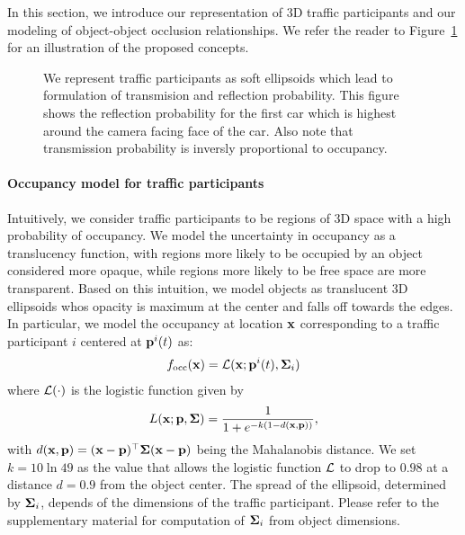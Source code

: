 
In this section, we introduce our representation of 3D traffic participants and our modeling of object-object occlusion relationships. We refer the reader to Figure~\ref{fig:reflectiontransimission} for an illustration of the proposed concepts.

\begin{figure}
  \usetikzlibrary{calc}
  \centering
  \begin{tikzpicture}
    
  \end{tikzpicture}
  \caption{We represent traffic participants as soft ellipsoids which lead to formulation of transmision and reflection probability. This figure shows the reflection probability for the first car which is highest around the camera facing face of the car. Also note that transmission probability is inversly proportional to occupancy.}
  \label{fig:reflectiontransimission}
\end{figure}

\paragraph{Occupancy model for traffic participants}
Intuitively, we consider traffic participants to be regions of 3D space with a high probability of occupancy. We model the uncertainty in occupancy as a translucency function, with regions more likely to be occupied by an object considered more opaque, while regions more likely to be free space are more transparent. Based on this intuition, we model objects as translucent 3D ellipsoids whos opacity is maximum at the center and falls off towards the edges. In particular, we model the occupancy at location $\bx$ corresponding to a traffic participant $i$ centered at $\pos{i}{t}$ as:
\begin{align}
  f_{\text{occ}}(\bx) = \cL(\bx; \pos{i}{t}, \bSigma_i)
\end{align}
where $\cL(\cdot)$ is the logistic function given by
\begin{align}
  L(\bx; \bp, \bSigma) = \frac{1}{1 + e^{-k(1 - d(\mathbf{x},\bp))}},
\end{align}
with $d(\bx, \bp) = (\bx-\bp)^\top\bSigma(\bx-\bp)$ being the Mahalanobis distance. We set $k = 10\ln{49}$ as the value that allows the logistic function $\cL$ to drop to $0.98$ at a distance $d = 0.9$ from the object center. The spread of the ellipsoid, determined by $\bSigma_i$, depends of the dimensions of the traffic participant. Please refer to the supplementary material for computation of $\bSigma_i$ from object dimensions.


